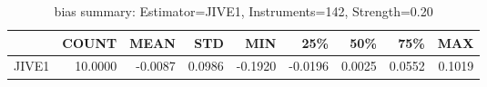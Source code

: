 \begin{table}[ht]
\centering
\caption{bias summary: Estimator=JIVE1, Instruments=142, Strength=0.20}
\begin{tabular}{lrrrrrrrr}
\toprule
 & COUNT & MEAN & STD & MIN & 25\% & 50\% & 75\% & MAX \\
\midrule
JIVE1 & 10.0000 & -0.0087 & 0.0986 & -0.1920 & -0.0196 & 0.0025 & 0.0552 & 0.1019 \\
\bottomrule
\end{tabular}
\end{table}
